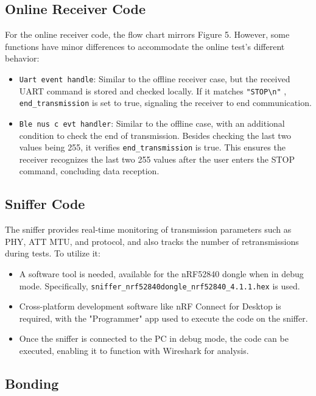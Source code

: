 \documentclass{Configuration_Files/PoliMi3i_thesis}
\begin{document}
\subsection{Online Receiver Code}
For the online receiver code, the flow chart mirrors Figure 5. However, some functions have minor differences to accommodate the online test's different behavior:
\begin{itemize}
    \item \texttt{Uart event handle}: Similar to the offline receiver case, but the received UART command is stored and checked locally. If it matches \texttt{"STOP\textbackslash n"}
    , \texttt{end\_transmission} is set to true, signaling the receiver to end communication.
    \item \texttt{Ble nus c evt handler}: Similar to the offline case, with an additional condition to check the end of transmission. Besides checking the last two values being 255, it verifies \texttt{end\_transmission} is true. This ensures the receiver recognizes the last two 255 values after the user enters the STOP command, concluding data reception.
\end{itemize}

\subsection{Sniffer Code}
The sniffer provides real-time monitoring of transmission parameters such as PHY, ATT MTU, and protocol, and also tracks the number of retransmissions during tests. To utilize it:
\begin{itemize}
    \item A software tool is needed, available for the nRF52840 dongle when in debug mode. Specifically, \texttt{sniffer\_nrf52840dongle\_nrf52840\_4.1.1.hex} is used.
    \item Cross-platform development software like nRF Connect for Desktop is required, with the "Programmer" app used to execute the code on the sniffer.
    \item Once the sniffer is connected to the PC in debug mode, the code can be executed, enabling it to function with Wireshark for analysis.
\end{itemize}


\subsection{Bonding}
\end{document}
